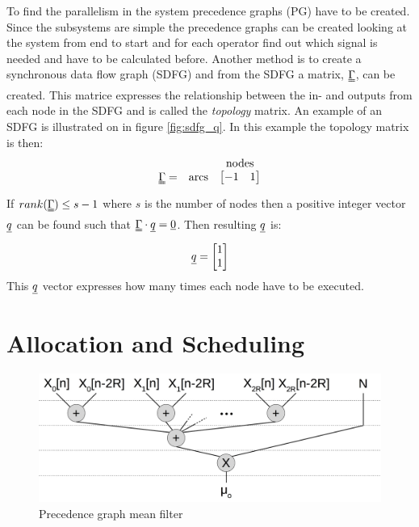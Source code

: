 To find the parallelism in the system precedence graphs (PG) have to be created. Since the subsystems are simple the precedence graphs can be created looking at the system from end to start and for each operator find out which signal is needed and have to be calculated before. Another method is to create a synchronous data flow graph (SDFG) and from the SDFG a matrix, $\uuline\Gamma$, can be created. This matrice expresses the relationship between the in- and outputs from each node in the SDFG and is called the \textit{topology} matrix. An example of an SDFG is illustrated on in figure \ref{fig:sdfg_q}. In this example the topology matrix is then:
\begin{equation}
  \begin{array}{ c c c }
    & & \text{nodes} \\
  \uuline\Gamma = & \text{arcs} & 
  \begin{bmatrix}
   -1 & 1 
  \end{bmatrix}
  \end{array}
\end{equation}
If $rank(\uuline \Gamma) \leq s-1$ where $s$ is the number of nodes then a positive integer vector $\uline q$ can be found such that $\uuline\Gamma \cdot \uline q = \uline 0$. Then resulting $\uline q$ is:
\begin{equation}
  \uline{q} =
  \begin{bmatrix}
  1 \\
  1
  \end{bmatrix}
\end{equation}
This $\uline q$ vector expresses how many times each node have to be executed.

\section{Allocation and Scheduling}


\begin{figure}[ht!]
  \centering
  \includegraphics[scale=0.3]{figures/pg_mean_filter}
  \caption{Precedence graph mean filter}
  \label{fig:pg_mean}
\end{figure}

